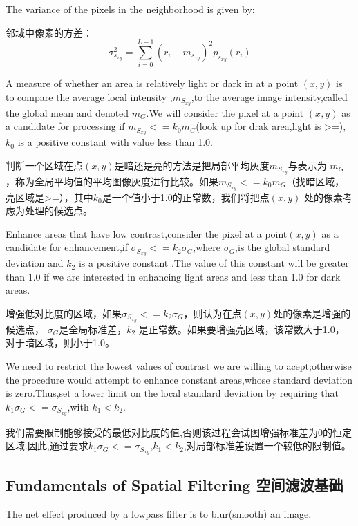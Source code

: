 \documentclass[12pt]{article}
\numberwithin{equation}{section}%
\begin{document}
The variance of the pixels in the neighborhood is given by:

邻域中像素的方差：
\begin{equation} \label {3.23}
\sigma^{2}_{s_{xy}}=\sum_{i=0}^{L-1}(r_{i}-m_{s_{xy}})^{2}p_{s_{xy}}(r_{i})
\end{equation}

A measure of whether an area is relatively light or dark in at  a point $(x,y)$ is to compare the average local intensity ,$m_{S_{xy}}$,to the average image intensity,called the global mean and denoted $m_{G}$.We will consider the pixel at a point $(x,y)$ as a candidate for processing if $m_{S_{xy}}<=k_{0}m_{G}$(look up for drak area,light is >=),$k_{0}$ is a positive constant with value less than 1.0.

判断一个区域在点$(x,y)$是暗还是亮的方法是把局部平均灰度$m_{S_{xy}}$与表示为 $m_{G}$，称为全局平均值的平均图像灰度进行比较。如果$m_{S_{xy}}<=k_{0}m_{G}$（找暗区域，亮区域是>=），其中$k_{0}$是一个值小于1.0的正常数，我们将把点$(x,y)$ 处的像素考虑为处理的候选点。

Enhance areas that have low contrast,consider the pixel at a point$(x,y)$ as a candidate for enhancement,if $ \sigma_{S_{xy}}<=k_{2}\sigma_{G}$,where $\sigma_{G}$,is the global standard deviation and $k_{2}$ is a positive constant .The value of this constant will be greater than 1.0 if we are interested in enhancing light areas and less than 1.0 for dark areas.

增强低对比度的区域，如果$ \sigma_{S_{xy}}<=k_{2}\sigma_{G}$，则认为在点$(x,y)$处的像素是增强的候选点， $\sigma_{G}$是全局标准差，$k_{2}$ 是正常数。如果要增强亮区域，该常数大于1.0，对于暗区域，则小于1.0。

We need to restrict the lowest values of contrast we are willing to acept;otherwise the procedure would attempt to enhance constant areas,whose standard deviation is zero.Thus,set a lower limit on the local standard deviation by requiring that $k_{1}\sigma_{G}<=\sigma_{S_{xy}}$,with $k_{1}<k_{2}$.

我们需要限制能够接受的最低对比度的值,否则该过程会试图增强标准差为0的恒定区域.因此,通过要求$k_{1}\sigma_{G}<=\sigma_{S_{xy}}$,$k_{1}<k_{2}$,对局部标准差设置一个较低的限制值。

\subsection{Fundamentals of Spatial Filtering 空间滤波基础}

The net effect produced by a lowpass filter is to blur(smooth)  an image.
\end{document}
